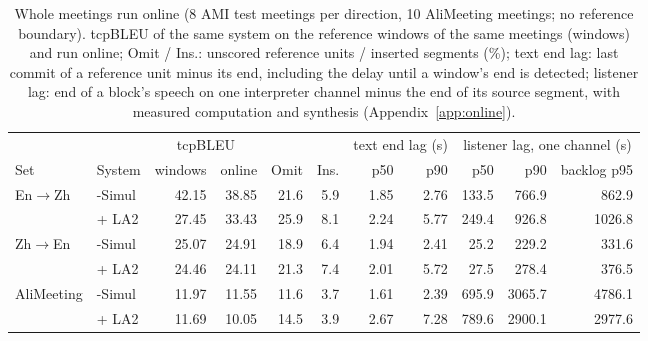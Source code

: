 \begin{table}[t]
\centering\small
\setlength{\tabcolsep}{3.2pt}
\begin{tabular}{llrrrrrrrrr}
\toprule
 & & \multicolumn{2}{c}{tcpBLEU} & & & \multicolumn{2}{c}{text end lag (s)} & \multicolumn{3}{c}{listener lag, one channel (s)} \\
\cmidrule(lr){3-4}\cmidrule(lr){7-8}\cmidrule(lr){9-11}
Set & System & windows & online & Omit & Ins. & p50 & p90 & p50 & p90 & backlog p95 \\
\midrule
En$\rightarrow$Zh & \sys{}-Simul & 42.15 & 38.85 & 21.6 & 5.9 & 1.85 & 2.76 & 133.5 & 766.9 & 862.9 \\
 & \sys{} + LA2 & 27.45 & 33.43 & 25.9 & 8.1 & 2.24 & 5.77 & 249.4 & 926.8 & 1026.8 \\
\midrule
Zh$\rightarrow$En & \sys{}-Simul & 25.07 & 24.91 & 18.9 & 6.4 & 1.94 & 2.41 & 25.2 & 229.2 & 331.6 \\
 & \sys{} + LA2 & 24.46 & 24.11 & 21.3 & 7.4 & 2.01 & 5.72 & 27.5 & 278.4 & 376.5 \\
\midrule
AliMeeting & \sys{}-Simul & 11.97 & 11.55 & 11.6 & 3.7 & 1.61 & 2.39 & 695.9 & 3065.7 & 4786.1 \\
 & \sys{} + LA2 & 11.69 & 10.05 & 14.5 & 3.9 & 2.67 & 7.28 & 789.6 & 2900.1 & 2977.6 \\
\bottomrule
\end{tabular}
\caption{Whole meetings run online (8 AMI test meetings per direction, 10 AliMeeting meetings; no reference boundary). tcpBLEU of the same system on the reference windows of the same meetings (windows) and run online; Omit / Ins.: unscored reference units / inserted segments (\%); text end lag: last commit of a reference unit minus its end, including the delay until a window's end is detected; listener lag: end of a block's speech on one interpreter channel minus the end of its source segment, with measured computation and synthesis (Appendix~\ref{app:online}).}
\label{tab:online}
\end{table}
